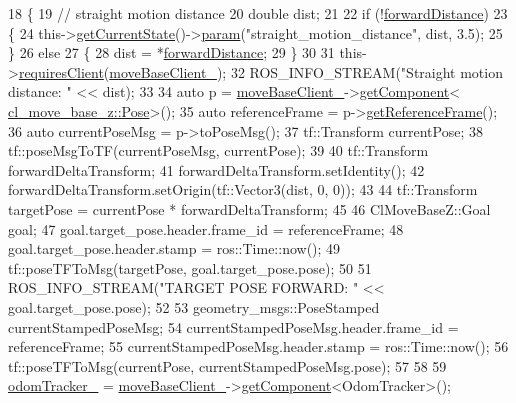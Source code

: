 \begin{DoxyCode}
18 \{
19     \textcolor{comment}{// straight motion distance}
20     \textcolor{keywordtype}{double} dist;
21 
22     \textcolor{keywordflow}{if} (!\hyperlink{classcl__move__base__z_1_1CbNavigateForward_a41bc9c319c64be6302f7365173ccd2c5}{forwardDistance})
23     \{
24         this->\hyperlink{classsmacc_1_1SmaccClientBehavior_abf6773e4dd948f932f11a346dd6e7c2c}{getCurrentState}()->\hyperlink{classsmacc_1_1ISmaccState_a4f2ff8e3eda8aa9bbb60c8ff17d0def1}{param}(\textcolor{stringliteral}{"straight\_motion\_distance"}, dist, 3.5);
25     \}
26     \textcolor{keywordflow}{else}
27     \{
28         dist = *\hyperlink{classcl__move__base__z_1_1CbNavigateForward_a41bc9c319c64be6302f7365173ccd2c5}{forwardDistance};
29     \}
30 
31     this->\hyperlink{classsmacc_1_1SmaccClientBehavior_a917f001e763a1059af337bf4e164f542}{requiresClient}(\hyperlink{classcl__move__base__z_1_1CbNavigateForward_a128b88b91b3f600f5a28480d85405c16}{moveBaseClient\_});
32     ROS\_INFO\_STREAM(\textcolor{stringliteral}{"Straight motion distance: "} << dist);
33 
34     \textcolor{keyword}{auto} p = \hyperlink{classcl__move__base__z_1_1CbNavigateForward_a128b88b91b3f600f5a28480d85405c16}{moveBaseClient\_}->\hyperlink{classsmacc_1_1ISmaccClient_adef78db601749ca63c19e74a27cb88cc}{getComponent}<
      \hyperlink{classcl__move__base__z_1_1Pose}{cl\_move\_base\_z::Pose}>();
35     \textcolor{keyword}{auto} referenceFrame = p->\hyperlink{classcl__move__base__z_1_1Pose_af8c2dc151e74aa8da6b283d1c8563051}{getReferenceFrame}();
36     \textcolor{keyword}{auto} currentPoseMsg = p->toPoseMsg();
37     tf::Transform currentPose;
38     tf::poseMsgToTF(currentPoseMsg, currentPose);
39 
40     tf::Transform forwardDeltaTransform;
41     forwardDeltaTransform.setIdentity();
42     forwardDeltaTransform.setOrigin(tf::Vector3(dist, 0, 0));
43 
44     tf::Transform targetPose = currentPose * forwardDeltaTransform;
45 
46     ClMoveBaseZ::Goal goal;
47     goal.target\_pose.header.frame\_id = referenceFrame;
48     goal.target\_pose.header.stamp = ros::Time::now();
49     tf::poseTFToMsg(targetPose, goal.target\_pose.pose);
50 
51     ROS\_INFO\_STREAM(\textcolor{stringliteral}{"TARGET POSE FORWARD: "} << goal.target\_pose.pose);
52 
53     geometry\_msgs::PoseStamped currentStampedPoseMsg;
54     currentStampedPoseMsg.header.frame\_id = referenceFrame;
55     currentStampedPoseMsg.header.stamp = ros::Time::now();
56     tf::poseTFToMsg(currentPose, currentStampedPoseMsg.pose);
57 
58     
59     \hyperlink{classcl__move__base__z_1_1CbNavigateForward_a7583a4d669af48618bd45950db8e5292}{odomTracker\_} = \hyperlink{classcl__move__base__z_1_1CbNavigateForward_a128b88b91b3f600f5a28480d85405c16}{moveBaseClient\_}->\hyperlink{classsmacc_1_1ISmaccClient_adef78db601749ca63c19e74a27cb88cc}{getComponent}<OdomTracker>();

\end{DoxyCode}

